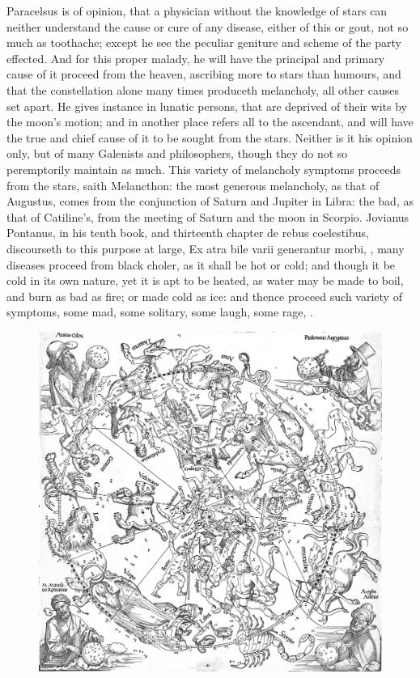 {{Paracelsus is of opinion, that a physician without the knowledge
of stars can neither understand the cause or cure of any disease,
either of this or gout, not so much as toothache; except he see the
peculiar geniture and scheme of the party effected. And for this proper
malady, he will have the principal and primary cause of it proceed from
the heaven, ascribing more to stars than humours, and that the
constellation alone many times produceth melancholy, all other causes
set apart. He gives instance in lunatic persons, that are deprived of
their wits by the moon's motion; and in another place refers all to the
ascendant, and will have the true and chief cause of it to be sought
from the stars. Neither is it his opinion only, but of many Galenists
and philosophers, though they do not so peremptorily maintain as much.
This variety of melancholy symptoms proceeds from the stars, saith
Melancthon: the most generous melancholy, as that of Augustus,
comes from the conjunction of Saturn and Jupiter in Libra: the bad, as
that of Catiline's, from the meeting of Saturn and the moon in Scorpio.
Jovianus Pontanus, in his tenth book, and thirteenth chapter de rebus
coelestibus, discourseth to this purpose at large, Ex atra bile varii
generantur morbi, \etc{}, many diseases proceed from black choler,
as it shall be hot or cold; and though it be cold in its own nature,
yet it is apt to be heated, as water may be made to boil, and burn as
bad as fire; or made cold as ice: and thence proceed such variety of
symptoms, some mad, some solitary, some laugh, some rage, \etc{}.

\begin{figure}[p]
  \begingroup
  \centering
  \includegraphics[keepaspectratio,width=\textwidth]{figures/SkyMap-small.jpg}
  \label{fig:skymap}
\end{figure}

}}
